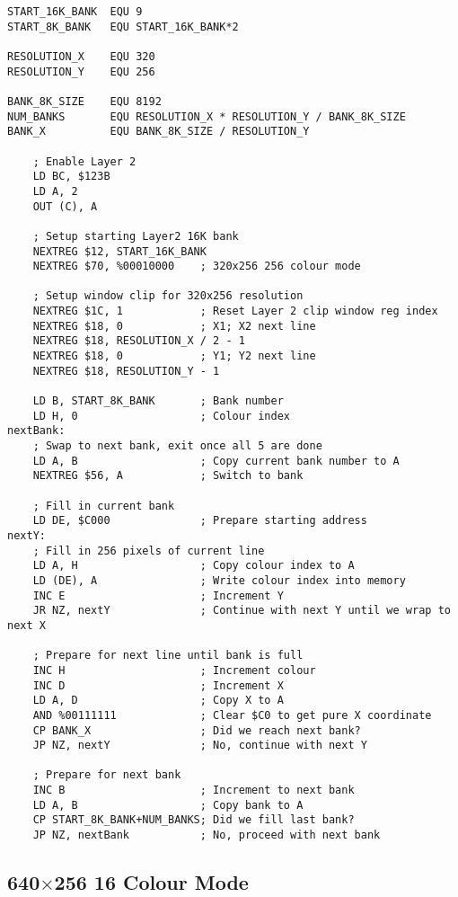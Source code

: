 \begin{lstlisting}
START_16K_BANK  EQU 9
START_8K_BANK   EQU START_16K_BANK*2

RESOLUTION_X    EQU 320
RESOLUTION_Y    EQU 256

BANK_8K_SIZE    EQU 8192
NUM_BANKS       EQU RESOLUTION_X * RESOLUTION_Y / BANK_8K_SIZE
BANK_X          EQU BANK_8K_SIZE / RESOLUTION_Y

    ; Enable Layer 2
    LD BC, $123B
    LD A, 2
    OUT (C), A

    ; Setup starting Layer2 16K bank
    NEXTREG $12, START_16K_BANK
    NEXTREG $70, %00010000    ; 320x256 256 colour mode

    ; Setup window clip for 320x256 resolution
    NEXTREG $1C, 1            ; Reset Layer 2 clip window reg index
    NEXTREG $18, 0            ; X1; X2 next line
    NEXTREG $18, RESOLUTION_X / 2 - 1
    NEXTREG $18, 0            ; Y1; Y2 next line
    NEXTREG $18, RESOLUTION_Y - 1

    LD B, START_8K_BANK       ; Bank number
    LD H, 0                   ; Colour index
nextBank:
    ; Swap to next bank, exit once all 5 are done
    LD A, B                   ; Copy current bank number to A
    NEXTREG $56, A            ; Switch to bank

    ; Fill in current bank
    LD DE, $C000              ; Prepare starting address
nextY:
    ; Fill in 256 pixels of current line
    LD A, H                   ; Copy colour index to A
    LD (DE), A                ; Write colour index into memory
    INC E                     ; Increment Y
    JR NZ, nextY              ; Continue with next Y until we wrap to next X

    ; Prepare for next line until bank is full
    INC H                     ; Increment colour
    INC D                     ; Increment X
    LD A, D                   ; Copy X to A
    AND %00111111             ; Clear $C0 to get pure X coordinate
    CP BANK_X                 ; Did we reach next bank?
    JP NZ, nextY              ; No, continue with next Y

    ; Prepare for next bank
    INC B                     ; Increment to next bank
    LD A, B                   ; Copy bank to A
    CP START_8K_BANK+NUM_BANKS; Did we fill last bank?
    JP NZ, nextBank           ; No, proceed with next bank
\end{lstlisting}


\pagebreak
\subsection{640$\times$256 16 Colour Mode}

